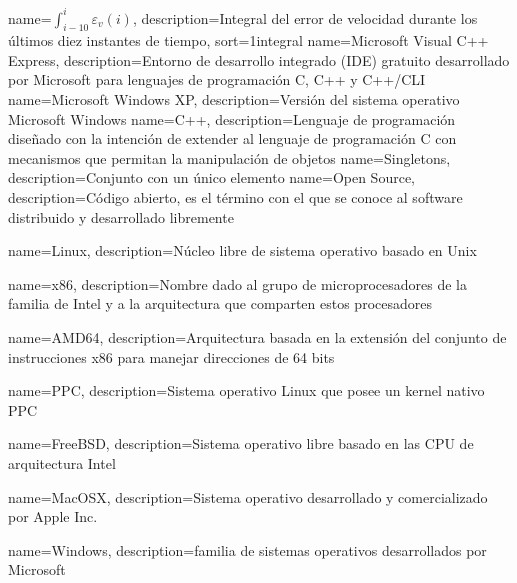{
  name={\ensuremath{\int_{i-10}^{i}\varepsilon_v(i)}},
  description={Integral del error de velocidad durante los últimos diez instantes de tiempo},
  sort=1integral
}
{	
	name={Microsoft Visual C++ Express},
    description={Entorno de desarrollo integrado (IDE) gratuito desarrollado por Microsoft para lenguajes de programación C, C++ y C++/CLI} 
}
{	
	name={Microsoft Windows XP},
    description={Versión del sistema operativo Microsoft Windows} 
}
{
	name={C++},
    description={Lenguaje de programación diseñado con la intención de extender al lenguaje de programación C con mecanismos que permitan la manipulación de objetos}   
}
{
	name={Singletons},
    description={Conjunto con un único elemento}   
}
{
	name={Open Source},
    description={Código abierto, es el término con el que se conoce al software distribuido y desarrollado libremente}
}

{
	name={Linux},
    description={Núcleo libre de sistema operativo basado en Unix}
}

{
	name={x86},
    description={Nombre dado al grupo de microprocesadores de la familia de Intel y a la arquitectura que comparten estos procesadores}
}

{
	name={AMD64},
    description={Arquitectura basada en la extensión del conjunto de instrucciones x86 para manejar direcciones de 64 bits}
}

{	
	name={PPC},
    description={Sistema operativo Linux que posee un kernel nativo PPC}
}

{	
	name={FreeBSD},
    description={Sistema operativo libre basado en las CPU de arquitectura Intel}
}

{
	name={MacOSX},
    description={Sistema operativo desarrollado y comercializado por Apple Inc.}
}

{
	name={Windows},
    description={familia de sistemas operativos desarrollados por Microsoft}
}